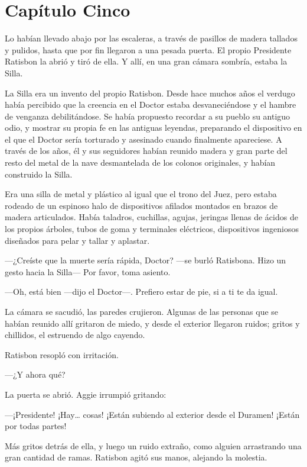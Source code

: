\chapter*{Capítulo Cinco}

Lo habían llevado abajo por las escaleras, a través de pasillos de
madera tallados y pulidos, hasta que por fin llegaron a una pesada
puerta. El propio Presidente Ratisbon la abrió y tiró de ella. Y allí,
en una gran cámara sombría, estaba la Silla.

La Silla era un invento del propio Ratisbon. Desde hace muchos años el
verdugo había percibido que la creencia en el Doctor estaba
desvaneciéndose y el hambre de venganza debilitándose. Se había
propuesto recordar a su pueblo su antiguo odio, y mostrar su propia fe
en las antiguas leyendas, preparando el dispositivo en el que el Doctor
sería torturado y asesinado cuando finalmente apareciese. A través de
los años, él y sus seguidores habían reunido madera y gran parte del
resto del metal de la nave desmantelada de los colonos originales, y
habían construido la Silla.

Era una silla de metal y plástico al igual que el trono del Juez, pero
estaba rodeado de un espinoso halo de dispositivos afilados montados en
brazos de madera articulados. Había taladros, cuchillas, agujas,
jeringas llenas de ácidos de los propios árboles, tubos de goma y
terminales eléctricos, dispositivos ingeniosos diseñados para pelar y
tallar y aplastar.

---¿Creíste que la muerte sería rápida, Doctor? ---se burló Ratisbona.
Hizo un gesto hacia la Silla--- Por favor, toma asiento.

---Oh, está bien ---dijo el Doctor---. Prefiero estar de pie, si a ti te
da igual.

La cámara se sacudió, las paredes crujieron. Algunas de las personas que
se habían reunido allí gritaron de miedo, y desde el exterior llegaron
ruidos; gritos y chillidos, el estruendo de algo cayendo.

Ratisbon resopló con irritación.

---¿Y ahora qué?

La puerta se abrió. Aggie irrumpió gritando:

---¡Presidente! ¡Hay\ldots{} cosas! ¡Están subiendo al exterior desde el
Duramen! ¡Están por todas partes!

Más gritos detrás de ella, y luego un ruido extraño, como alguien
arrastrando una gran cantidad de ramas. Ratisbon agitó sus manos,
alejando la molestia.

